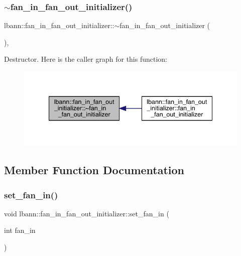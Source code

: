 \subsubsection{\texorpdfstring{$\sim$fan\+\_\+in\+\_\+fan\+\_\+out\+\_\+initializer()}{~fan\_in\_fan\_out\_initializer()}}
{\footnotesize\ttfamily lbann\+::fan\+\_\+in\+\_\+fan\+\_\+out\+\_\+initializer\+::$\sim$fan\+\_\+in\+\_\+fan\+\_\+out\+\_\+initializer (\begin{DoxyParamCaption}{ }\end{DoxyParamCaption})\hspace{0.3cm}{\ttfamily [override]}, {\ttfamily [default]}}

Destructor. Here is the caller graph for this function\+:\nopagebreak
\begin{figure}[H]
\begin{center}
\leavevmode
\includegraphics[width=340pt]{classlbann_1_1fan__in__fan__out__initializer_ab351750e3f776aa6748053f29d5d031c_icgraph}
\end{center}
\end{figure}


\subsection{Member Function Documentation}
\mbox{\label{classlbann_1_1fan__in__fan__out__initializer_a6da7299bd2fb6aa1b549125fc62ffafc}} 
\subsubsection{\texorpdfstring{set\+\_\+fan\+\_\+in()}{set\_fan\_in()}}
{\footnotesize\ttfamily void lbann\+::fan\+\_\+in\+\_\+fan\+\_\+out\+\_\+initializer\+::set\+\_\+fan\+\_\+in (\begin{DoxyParamCaption}\item[{int}]{fan\+\_\+in }\end{DoxyParamCaption})\hspace{0.3cm}{\ttfamily [inline]}}

